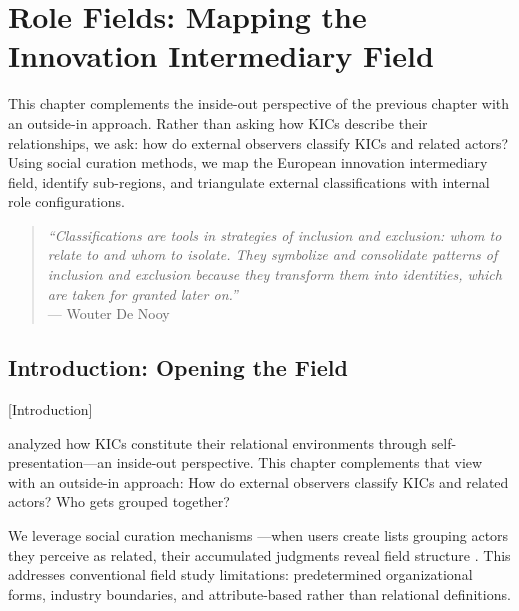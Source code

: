 \documentclass[../main.tex]{subfiles}
\begin{document}
\chapter{Role Fields: Mapping the Innovation Intermediary Field}
\margintoc

\begin{chapteroverview}
This chapter complements the inside-out perspective of the previous chapter with an outside-in approach. Rather than asking how KICs describe their relationships, we ask: how do external observers classify KICs and related actors? Using social curation methods, we map the European innovation intermediary field, identify sub-regions, and triangulate external classifications with internal role configurations.
\end{chapteroverview}

\begin{quote}
\textit{``Classifications are tools in strategies of inclusion and exclusion: whom to relate to and whom to isolate. They symbolize and consolidate patterns of inclusion and exclusion because they transform them into identities, which are taken for granted later on.''}\\
--- Wouter De Nooy \cite{denooy2003fields}
\end{quote}


\section{Introduction: Opening the Field}[Introduction]

 analyzed how KICs constitute their relational environments through self-presentation---an inside-out perspective. This chapter complements that view with an outside-in approach: How do external observers classify KICs and related actors? Who gets grouped together?

We leverage social curation mechanisms ---when users create lists grouping actors they perceive as related, their accumulated judgments reveal field structure \cite{bowker1999sorting,lazer2009computational}. This addresses conventional field study limitations: predetermined organizational forms, industry boundaries, and attribute-based rather than relational definitions.
\end{document}
